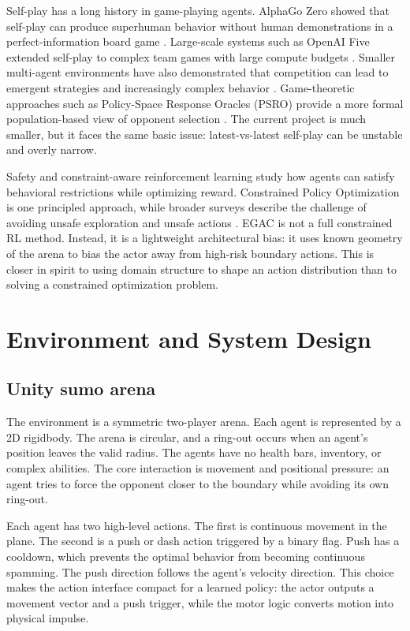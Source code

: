\documentclass{article}
\begin{document}
Self-play has a long history in game-playing agents. AlphaGo Zero showed that self-play can produce superhuman behavior without human demonstrations in a perfect-information board game \citep{silver2017alphagozero}. Large-scale systems such as OpenAI Five extended self-play to complex team games with large compute budgets \citep{berner2019dota}. Smaller multi-agent environments have also demonstrated that competition can lead to emergent strategies and increasingly complex behavior \citep{bansal2018emergent}. Game-theoretic approaches such as Policy-Space Response Oracles (PSRO) provide a more formal population-based view of opponent selection \citep{lanctot2017psro}. The current project is much smaller, but it faces the same basic issue: latest-vs-latest self-play can be unstable and overly narrow.

Safety and constraint-aware reinforcement learning study how agents can satisfy behavioral restrictions while optimizing reward. Constrained Policy Optimization \citep{achiam2017cpo} is one principled approach, while broader surveys describe the challenge of avoiding unsafe exploration and unsafe actions \citep{garcia2015safe}. EGAC is not a full constrained RL method. Instead, it is a lightweight architectural bias: it uses known geometry of the arena to bias the actor away from high-risk boundary actions. This is closer in spirit to using domain structure to shape an action distribution than to solving a constrained optimization problem.

\section{Environment and System Design}

\subsection{Unity sumo arena}

The environment is a symmetric two-player arena. Each agent is represented by a 2D rigidbody. The arena is circular, and a ring-out occurs when an agent's position leaves the valid radius. The agents have no health bars, inventory, or complex abilities. The core interaction is movement and positional pressure: an agent tries to force the opponent closer to the boundary while avoiding its own ring-out.

Each agent has two high-level actions. The first is continuous movement in the plane. The second is a push or dash action triggered by a binary flag. Push has a cooldown, which prevents the optimal behavior from becoming continuous spamming. The push direction follows the agent's velocity direction. This choice makes the action interface compact for a learned policy: the actor outputs a movement vector and a push trigger, while the motor logic converts motion into physical impulse.
\end{document}
